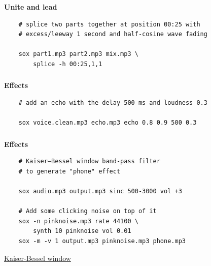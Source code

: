 \documentclass[usenames,dvipsnames, 18pt, compress, aspectratio=169]{beamer}
\begin{document}
\begin{frame}[fragile]{}
    \frametitle{}
    \begin{center}
        \textbf{Unite and lead}
        \vspace{0.2cm}

        \begin{verbatim}
    # splice two parts together at position 00:25 with
    # excess/leeway 1 second and half-cosine wave fading

    sox part1.mp3 part2.mp3 mix.mp3 \
        splice -h 00:25,1,1
        \end{verbatim}
    \end{center}
\end{frame}

\begin{frame}[fragile]{}
    \frametitle{}
    \begin{center}
        \textbf{Effects}
        \vspace{0.2cm}

        \begin{verbatim}
    # add an echo with the delay 500 ms and loudness 0.3

    sox voice.clean.mp3 echo.mp3 echo 0.8 0.9 500 0.3
        \end{verbatim}
    \end{center}
\end{frame}

\begin{frame}[fragile]{}
    \frametitle{}
    \begin{center}
        \textbf{Effects}
        \vspace{0.2cm}

        \begin{verbatim}
    # Kaiser–Bessel window band-pass filter
    # to generate "phone" effect

    sox audio.mp3 output.mp3 sinc 500-3000 vol +3

    # Add some clicking noise on top of it
    sox -n pinknoise.mp3 rate 44100 \
        synth 10 pinknoise vol 0.01
    sox -m -v 1 output.mp3 pinknoise.mp3 phone.mp3
        \end{verbatim}

        \href{https://en.wikipedia.org/wiki/Kaiser_window}{Kaiser-Bessel window}
    \end{center}
\end{frame}
\end{document}
